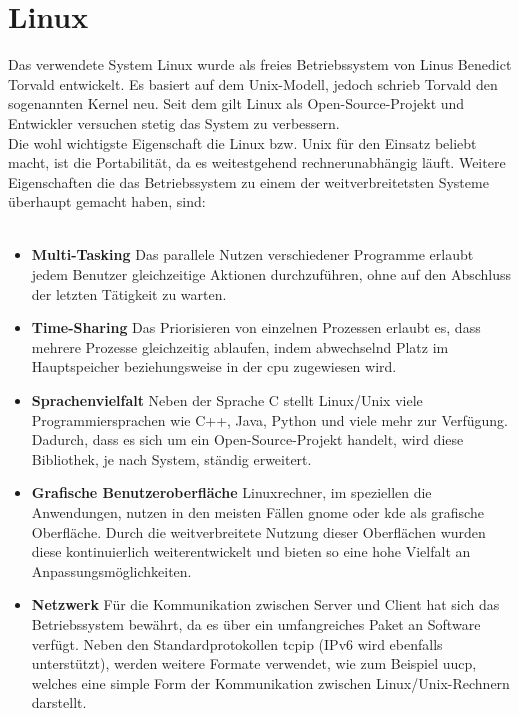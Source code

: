 \section{Linux}\label{kap:linux}


Das verwendete System Linux wurde als freies Betriebssystem von Linus Benedict Torvald entwickelt.
Es basiert auf dem Unix-Modell, jedoch schrieb Torvald den sogenannten Kernel neu. Seit dem gilt
Linux als Open-Source-Projekt und Entwickler versuchen stetig das System zu verbessern.\cite{linux}\\
Die wohl wichtigste Eigenschaft die Linux bzw. Unix für den Einsatz beliebt macht, ist die Portabilität,
da es weitestgehend rechnerunabhängig läuft. Weitere Eigenschaften die das Betriebssystem zu einem der
 weitverbreitetsten Systeme überhaupt gemacht haben, sind:\\\cite{linux}\\
\begin{itemize}
\item  \textbf{Multi-Tasking} Das parallele Nutzen verschiedener Programme erlaubt jedem Benutzer
        gleichzeitige Aktionen durchzuführen, ohne auf den Abschluss der letzten Tätigkeit zu warten.
\item  \textbf{Time-Sharing} Das Priorisieren von einzelnen Prozessen erlaubt es, dass mehrere
        Prozesse gleichzeitig ablaufen, indem abwechselnd Platz im Hauptspeicher beziehungsweise in der \ac{cpu}
        zugewiesen wird.
\item \textbf{Sprachenvielfalt} Neben der Sprache C stellt Linux/Unix viele Programmiersprachen
      wie C++, Java, Python und viele mehr zur Verfügung. Dadurch, dass es sich um ein Open-Source-Projekt handelt,
      wird diese Bibliothek, je nach System, ständig erweitert.
\item \textbf{Grafische Benutzeroberfläche} Linuxrechner, im speziellen die Anwendungen, nutzen in
      den meisten Fällen \ac{gnome} oder \ac{kde} als grafische Oberfläche. Durch die weitverbreitete Nutzung
      dieser Oberflächen wurden diese kontinuierlich weiterentwickelt und bieten so eine hohe Vielfalt an
      Anpassungsmöglichkeiten.
\item \textbf{Netzwerk} Für die Kommunikation zwischen Server und Client hat sich das Betriebssystem bewährt,
      da es über ein umfangreiches Paket an Software verfügt. Neben den Standardprotokollen \ac{tcpip} (IPv6 wird
      ebenfalls unterstützt), werden weitere Formate verwendet, wie zum Beispiel \ac{uucp}, welches eine simple Form
      der Kommunikation zwischen Linux/Unix-Rechnern darstellt.
\end{itemize}

